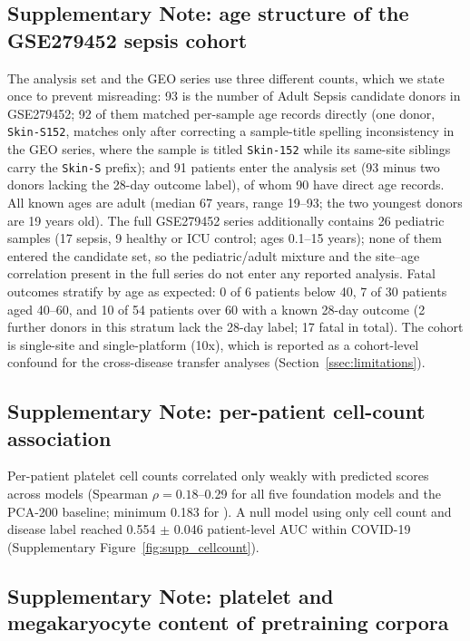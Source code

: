 \subsection{Supplementary Note: age structure of the GSE279452 sepsis cohort}
\label{sn:age}

The analysis set and the GEO series use three different counts, which we
state once to prevent misreading: 93 is the number of Adult Sepsis candidate
donors in GSE279452; 92 of them matched per-sample age records directly (one
donor, \texttt{Skin-S152}, matches only after correcting a sample-title
spelling inconsistency in the GEO series, where the sample is titled
\texttt{Skin-152} while its same-site siblings carry the \texttt{Skin-S}
prefix); and 91 patients enter the analysis set (93 minus two donors lacking
the 28-day outcome label), of whom 90 have direct age records. All known ages
are adult (median 67 years, range 19--93; the two youngest donors are 19
years old). The full GSE279452 series additionally contains 26 pediatric
samples (17 sepsis, 9 healthy or ICU control; ages 0.1--15 years); none of
them entered the candidate set, so the pediatric/adult mixture and the
site--age correlation present in the full series do not enter any reported
analysis. Fatal outcomes stratify by age as expected:
0 of 6 patients below 40, 7 of 30 patients aged 40--60, and 10 of 54
patients over 60 with a known 28-day outcome (2 further donors in this stratum
lack the 28-day label; 17 fatal in total). The cohort is single-site and single-platform
(10x), which is reported as a cohort-level confound for the cross-disease
transfer analyses (Section~\ref{ssec:limitations}).

\subsection{Supplementary Note: per-patient cell-count association}
\label{sn:cellcount}

Per-patient platelet cell counts correlated only weakly with predicted scores
across models (Spearman $\rho = 0.18$--0.29 for all five foundation models and
the PCA-200 baseline; minimum 0.183 for ). A null model using only
cell count and disease label reached 0.554 $\pm$ 0.046 patient-level AUC within
COVID-19 (Supplementary Figure~\ref{fig:supp_cellcount}).

\subsection{Supplementary Note: platelet and megakaryocyte content of pretraining corpora}
\label{sn:corpus_platelet}

